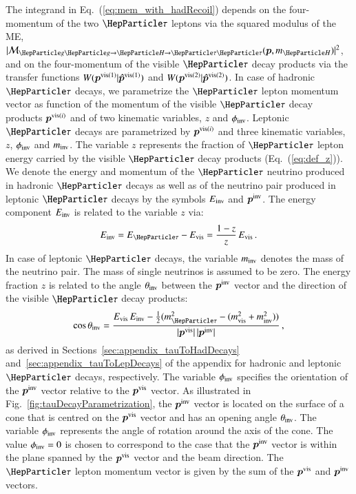 The integrand in Eq.~(\ref{eq:mem_with_hadRecoil}) depends on the
four-momentum of the two $\Pgt$ leptons via the squared modulus of the
ME, $\vert \mathcal{M}_{\Pg\Pg \to \PHiggs \to \Pgt\Pgt}(\bm{p},m_{\PHiggs}) \vert^{2}$,
and on the four-momentum of the visible $\Pgt$ decay products via the
transfer functions $W( \bm{p}^{\textrm{vis}(1)} | \bm{\hat{p}}^{\textrm{vis}(1)} )$ and $W( \bm{p}^{\textrm{vis}(2)} | \bm{\hat{p}}^{\textrm{vis}(2)} )$.
In case of hadronic $\Pgt$ decays, 
we parametrize the $\Pgt$ lepton momentum vector as function of the
momentum of the visible $\Pgt$ decay products $\bm{p}^{\textrm{vis}(i)}$ and of two kinematic variables,
$z$ and $\phi_{\textrm{inv}}$.
Leptonic $\Pgt$ decays are parametrized by $\bm{p}^{\textrm{vis}(i)}$ and
three kinematic variables, $z$, $\phi_{\textrm{inv}}$ and $m_{\textrm{inv}}$.
The variable $z$ represents the fraction of $\Pgt$ lepton energy
carried by the visible $\Pgt$ decay products (\cf Eq.~(\ref{eq:def_z})).
We denote the energy and momentum of the $\Pgt$ neutrino
produced in hadronic $\Pgt$ decays as well as of the neutrino pair produced in leptonic $\Pgt$
decays by the symbols $E_{\textrm{inv}}$ and $\bm{p}^{\textrm{inv}}$.
The energy component $E_{\textrm{inv}}$ is related to the variable $z$ via:
\begin{equation}
E_{\inv} = E_{\Pgt} - E_{\vis} = \frac{1 - z}{z} \, E_{\vis} \, .
\label{eq:E_inv}
\end{equation}
In case of leptonic $\Pgt$ decays, the variable $m_{\textrm{inv}}$ denotes the
mass of the neutrino pair. The mass of single neutrinos is assumed
to be zero.
The energy fraction $z$ is related to the angle $\theta_{\textrm{inv}}$ between the $\bm{p}^{\textrm{inv}}$ vector and the direction of the visible $\Pgt$ decay products:
\begin{equation}
\cos\theta_{\inv} = \frac{E_{\vis} \, E_{\inv} - \frac{1}{2}(m^{2}_{\Pgt} - (m^{2}_{\vis} + m^{2}_{\inv}))}{\vert\bm{p}^{\vis}\vert \, \vert\bm{p}^{\inv}\vert} \, ,
\label{eq:theta_inv}
\end{equation}
as derived in Sections~\ref{sec:appendix_tauToHadDecays}
and~\ref{sec:appendix_tauToLepDecays} of the appendix for
hadronic and leptonic $\Pgt$ decays, respectively.
The variable $\phi_{\textrm{inv}}$ specifies the orientation of the
$\bm{p}^{\textrm{inv}}$ vector relative to the $\bm{p}^{\textrm{vis}}$ vector.
As illustrated in Fig.~\ref{fig:tauDecayParametrization}, the
$\bm{p}^{\textrm{inv}}$ vector is located on the surface of a cone that is centred
on the $\bm{p}^{\textrm{vis}}$ vector and has an opening angle $\theta_{\textrm{inv}}$.
The variable $\phi_{\textrm{inv}}$ represents the angle of rotation around the
axis of the cone.
The value $\phi_{\textrm{inv}} = 0$ is chosen to correspond to the case that
the $\bm{p}^{\textrm{inv}}$ vector is within the plane spanned by the
$\bm{p}^{\textrm{vis}}$ vector and the beam direction.
The $\Pgt$ lepton momentum vector is given by the sum of the
$\bm{p}^{\textrm{vis}}$ and $\bm{p}^{\textrm{inv}}$ vectors.

